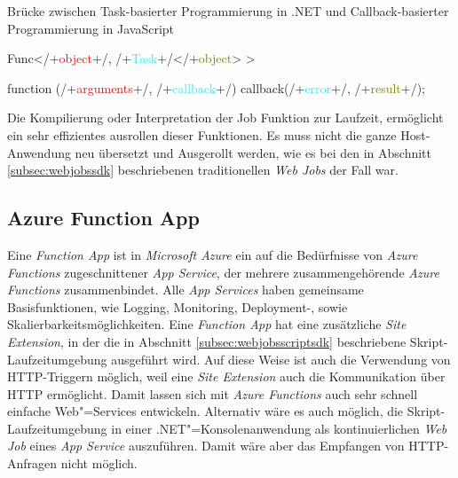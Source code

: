 \begin{program}[!hbt]
\caption{Brücke zwischen Task-basierter Programmierung in .NET und Callback-basierter Programmierung in JavaScript}
\label{prog:dotnet-javascript-bridge}
\noindent\begin{minipage}[t]{.48\textwidth}
\lstset{showlines=true}
\begin{GenericCode}
Func</+\textcolor{red}{object}+/, /+\textcolor{cyan}{Task}+/</+\textcolor{olive}{object}> >


\end{GenericCode} %

\end{minipage}\hfill
\begin{minipage}[t]{.48\textwidth}
\lstset{showlines=true}
\begin{GenericCode}
function (/+\textcolor{red}{arguments}+/, /+\textcolor{cyan}{callback}+/) {
  callback(/+\textcolor{cyan}{error}+/, /+\textcolor{olive}{result}+/);
}
\end{GenericCode}

\end{minipage}
\end{program}

Die Kompilierung oder Interpretation der Job Funktion zur Laufzeit, ermöglicht ein sehr effizientes ausrollen dieser Funktionen. Es muss nicht die ganze Host-Anwendung neu übersetzt und Ausgerollt werden, wie es bei den in Abschnitt \ref{subsec:webjobssdk} beschriebenen traditionellen \textit{Web Jobs} der Fall war.

\subsection{Azure Function App}

Eine \textit{Function App} ist in \textit{Microsoft Azure} ein auf die Bedürfnisse von \textit{Azure Functions} zugeschnittener \textit{App Service}, der mehrere zusammengehörende \textit{Azure Functions} zusammenbindet. Alle \textit{App Services} haben gemeinsame Basisfunktionen, wie \zB Logging, Monitoring, Deployment-, sowie Skalierbarkeitsmöglichkeiten. Eine \textit{Function App} hat eine zusätzliche \textit{Site Extension}, in der die in Abschnitt \ref{subsec:webjobsscriptsdk} beschriebene Skript-Laufzeitumgebung ausgeführt wird. Auf diese Weise ist auch die Verwendung von HTTP-Triggern möglich, weil eine \textit{Site Extension} auch die Kommunikation über HTTP ermöglicht. Damit lassen sich mit \textit{Azure Functions} auch sehr schnell einfache Web"=Services entwickeln. Alternativ wäre es auch möglich, die Skript-Laufzeitumgebung in einer .NET"=Konsolenanwendung als kontinuierlichen \textit{Web Job} eines \textit{App Service} auszuführen. Damit wäre aber das Empfangen von HTTP-Anfragen nicht möglich.


